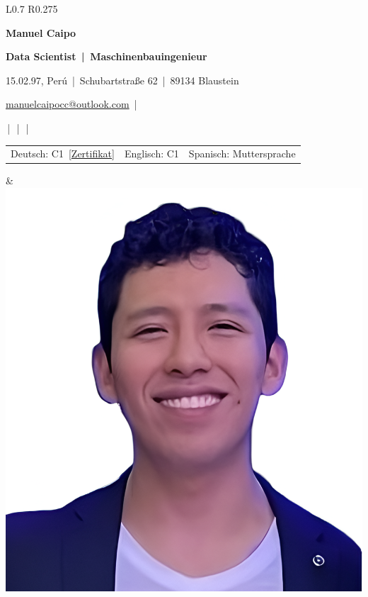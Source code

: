 \setlength{\tabcolsep}{6pt}
\begin{tabular}{L{0.7\linewidth} R{0.275\linewidth}}
  
  \vspace{-8em}
  {\Large\bfseries Manuel Caipo}

  
  \vspace{0.5em}
  \textbf{Data Scientist \,|\, Maschinenbauingenieur}

  \vspace{0.5em}
  \footnotesize
  15.02.97, Perú \,|\, Schubartstraße 62 \,|\, 89134 Blaustein\par
  \href{mailto:manuelcaipocc@outlook.com}{manuelcaipocc@outlook.com} \,|\, \par
  \,|\, 
  \,|\, 
  \,|\, 


\setlength{\tabcolsep}{3pt}
\begin{tabular}{@{}l l l@{}}
Deutsch: C1 \,[\href{https://1drv.ms/b/s!AlDxETe5fFgfo9lgpP0q0_ITTcZ6oA?e=j4ouwR}{Zertifikat}] &
Englisch: C1 &
Spanisch: Muttersprache
\end{tabular}

&
  \includegraphics[width=0.5\linewidth]{images/manuelcaipo.jpg}
\end{tabular}